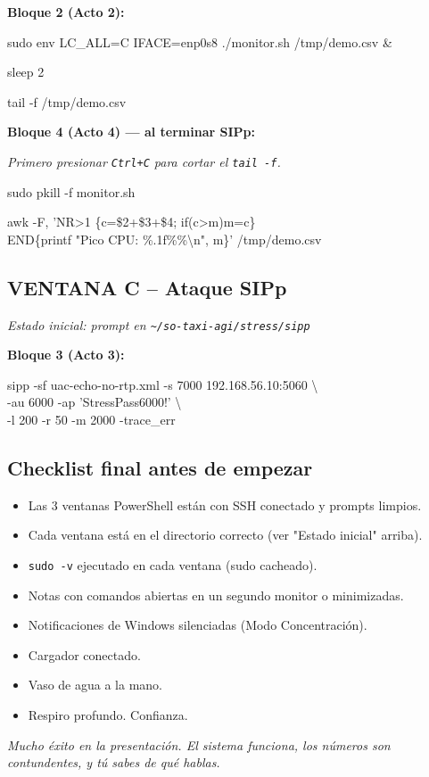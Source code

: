 \documentclass[11pt,letterpaper]{article}
\begin{document}
\textbf{Bloque 2 (Acto 2):}
\begin{comando}
sudo env LC\_ALL=C IFACE=enp0s8 ./monitor.sh /tmp/demo.csv \&

sleep 2

tail -f /tmp/demo.csv
\end{comando}

\textbf{Bloque 4 (Acto 4) --- al terminar SIPp:}

\textit{Primero presionar \texttt{Ctrl+C} para cortar el \texttt{tail -f}.}

\begin{comando}
sudo pkill -f monitor.sh

awk -F, 'NR>1 \{c=\$2+\$3+\$4; if(c>m)m=c\} \\
END\{printf "Pico CPU: \%.1f\%\%\textbackslash n", m\}' /tmp/demo.csv
\end{comando}

\subsection*{\color{rojo} VENTANA C -- Ataque SIPp}

\textit{Estado inicial: prompt en \texttt{\textasciitilde/so-taxi-agi/stress/sipp}}

\textbf{Bloque 3 (Acto 3):}
\begin{comando}
sipp -sf uac-echo-no-rtp.xml -s 7000 192.168.56.10:5060 \textbackslash\\
\hspace*{1em}-au 6000 -ap 'StressPass6000!' \textbackslash\\
\hspace*{1em}-l 200 -r 50 -m 2000 -trace\_err
\end{comando}

\vspace{1em}

\subsection*{Checklist final antes de empezar}

\begin{itemize}[leftmargin=1.5em, itemsep=0.2em]
  \item[$\square$] Las 3 ventanas PowerShell est\'an con SSH conectado y prompts limpios.
  \item[$\square$] Cada ventana est\'a en el directorio correcto (ver "Estado inicial" arriba).
  \item[$\square$] \texttt{sudo -v} ejecutado en cada ventana (sudo cacheado).
  \item[$\square$] Notas con comandos abiertas en un segundo monitor o minimizadas.
  \item[$\square$] Notificaciones de Windows silenciadas (Modo Concentraci\'on).
  \item[$\square$] Cargador conectado.
  \item[$\square$] Vaso de agua a la mano.
  \item[$\square$] Respiro profundo. Confianza.
\end{itemize}

\vspace{1em}
\begin{center}
\small\itshape Mucho \'exito en la presentaci\'on. El sistema funciona, los n\'umeros son contundentes, y t\'u sabes de qu\'e hablas.
\end{center}
\end{document}
